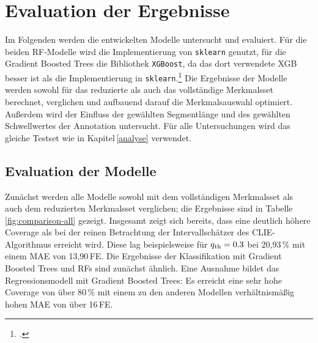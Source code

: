 \chapter{Evaluation der Ergebnisse}\label{evaluation}

Im Folgenden werden die entwickelten Modelle untersucht und evaluiert. Für die beiden \acl{RF}-Modelle wird die Implementierung von \texttt{sklearn} genutzt, für die Gradient Boosted Trees die Bibliothek \texttt{XGBoost}, da das dort verwendete \acf{XGB} besser ist als die Implementierung in \texttt{sklearn}.\footcite[Kapitel 10]{Harrison2019} Die Ergebnisse der Modelle werden sowohl für das reduzierte als auch das vollständige Merkmalsset berechnet, verglichen und aufbauend darauf die Merkmalsauswahl optimiert. Außerdem wird der Einfluss der gewählten Segmentlänge und des gewählten Schwellwertes der Annotation untersucht. Für alle Untersuchungen wird das gleiche Testset wie in Kapitel\,\ref{analyse} verwendet.

\section{Evaluation der Modelle}

Zunächst werden alle Modelle sowohl mit dem vollständigen Merkmalsset als auch dem reduzierten Merkmalsset verglichen; die Ergebnisse sind in Tabelle\,\ref{fig:comparison-all} gezeigt. Insgesamt zeigt sich bereits, dass eine deutlich höhere Coverage als bei der reinen Betrachtung der Intervallschätzer des CLIE-Algorithmus erreicht wird. Diese lag beispielsweise für $q\textsubscript{th} = 0.3$ bei 20,93\,\% mit einem \ac{MAE} von 13,90\,\si{FE}. Die Ergebnisse der Klassifikation mit Gradient Boosted Trees und \acl{RF}s sind zunächst ähnlich. Eine Ausnahme bildet das Regressionsmodell mit Gradient Boosted Trees: Es erreicht eine sehr hohe Coverage von über 80\,\% mit einem zu den anderen Modellen verhältnismäßig hohen \ac{MAE} von über 16\,\si{FE}.

